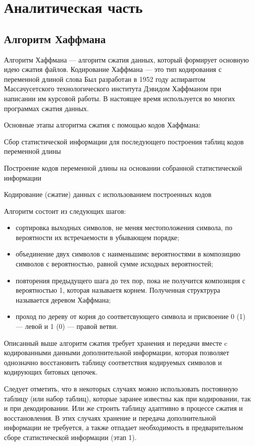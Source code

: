 \section{Аналитическая часть}

\subsection{Алгоритм Хаффмана}

Алгоритм Хаффмана --- алгоритм сжатия данных, который формирует основную идею сжатия файлов. 
Кодирование Хаффмана --- это тип кодирования с переменной длиной слова
Был разработан в 1952 году аспирантом Массачусетского технологического института Дэвидом Хаффманом при написании им курсовой работы. 
В настоящее время используется во многих программах сжатия данных.

Основные этапы алгоритма сжатия с помощью кодов Хаффмана:

Сбор статистической информации для последующего построения таблиц кодов переменной длины

Построение кодов переменной длины на основании собранной статистической информации

Кодирование (сжатие) данных с использованием построенных кодов

Алгоритм состоит из следующих шагов:
\begin{itemize}
	\item сортировка выходных символов, не меняя местоположения символа, по вероятности их встречаемости в убывающем порядке;
	\item объединение двух символов с наименьшимс вероятностями в композицию символов с вероятностью, равной сумме исходных вероятностей;
	\item повторения предыдущего шага до тех пор, пока не получится композиция с вероятностью 1, которая называетя корнем. Полученная структрура называется деревом Хаффмана;
	\item проход по дереву от корня до соответсвующего символа и присвоение 0 (1) --- левой и 1 (0) --- правой ветви. 
\end{itemize}

Описанный выше алгоритм сжатия требует хранения и передачи вместе c кодированными данными дополнительной информации, которая позволяет однозначно восстановить таблицу соответствия кодируемых символов и кодирующих битовых цепочек.

Следует отметить, что в некоторых случаях можно использовать постоянную таблицу (или набор таблиц), которые заранее известны как при кодировании, так и при декодировании. Или же строить таблицу адаптивно в процессе сжатия и восстановления. В этих случаях хранение и передача дополнительной информации не требуется, а также отпадает необходимость в предварительном сборе статистической информации (этап 1).



